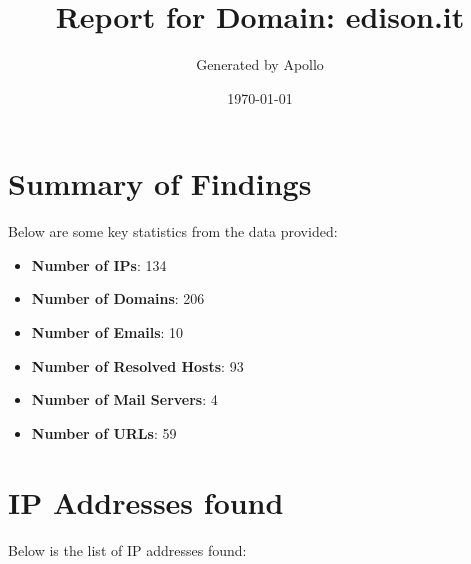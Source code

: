 \documentclass{article}
\title{Report for Domain: edison.it}
\author{Generated by Apollo}
\date{\today}
\begin{document}
\maketitle

\section*{Summary of Findings}

Below are some key statistics from the data provided:

\begin{itemize}
    \item \textbf{Number of IPs}: 134
    \item \textbf{Number of Domains}: 206
    \item \textbf{Number of Emails}: 10
    \item \textbf{Number of Resolved Hosts}: 93
    \item \textbf{Number of Mail Servers}: 4
    \item \textbf{Number of URLs}: 59
\end{itemize}

\section*{IP Addresses found}

Below is the list of IP addresses found:
\end{document}
